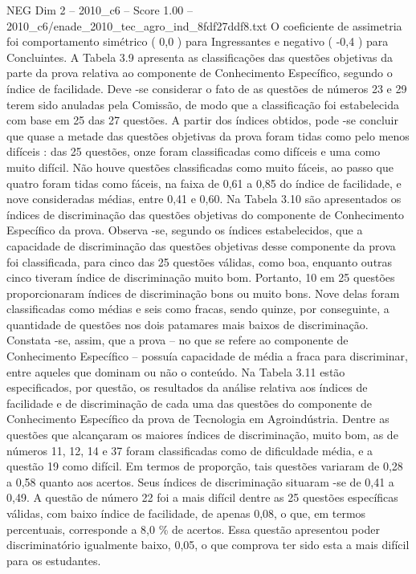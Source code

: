 \begin{textsample}{NEG Dim 2 – 2010\_c6 – Score 1.00 – 2010\_c6/enade\_2010\_tec\_agro\_ind\_8fdf27ddf8.txt}
O coeficiente de assimetria foi comportamento simétrico ( 0,0 ) para Ingressantes e negativo ( -0,4 ) para Concluintes.
A Tabela 3.9 apresenta as classificações das questões objetivas da parte da prova relativa ao componente de Conhecimento Específico, segundo o índice de facilidade.
Deve -se considerar o fato de as questões de números 23 e 29 terem sido anuladas pela Comissão, de modo que a classificação foi estabelecida com base em 25 das 27 questões.
A partir dos índices obtidos, pode -se concluir que quase a metade das questões objetivas da prova foram tidas como pelo menos difíceis : das 25 questões, onze foram classificadas como difíceis e uma como muito difícil.
Não houve questões classificadas como muito fáceis, ao passo que quatro foram tidas como fáceis, na faixa de 0,61 a 0,85 do índice de facilidade, e nove consideradas médias, entre 0,41 e 0,60.
Na Tabela 3.10 são apresentados os índices de discriminação das questões objetivas do componente de Conhecimento Específico da prova.
Observa -se, segundo os índices estabelecidos, que a capacidade de discriminação das questões objetivas desse componente da prova foi classificada, para cinco das 25 questões válidas, como boa, enquanto outras cinco tiveram índice de discriminação muito bom.
Portanto, 10 em 25 questões proporcionaram índices de discriminação bons ou muito bons.
Nove delas foram classificadas como médias e seis como fracas, sendo quinze, por conseguinte, a quantidade de questões nos dois patamares mais baixos de discriminação.
Constata -se, assim, que a prova – no que se refere ao componente de Conhecimento Específico – possuía capacidade de média a fraca para discriminar, entre aqueles que dominam ou não o conteúdo.
Na Tabela 3.11 estão especificados, por questão, os resultados da análise relativa aos índices de facilidade e de discriminação de cada uma das questões do componente de Conhecimento Específico da prova de Tecnologia em Agroindústria.
Dentre as questões que alcançaram os maiores índices de discriminação, muito bom, as de números 11, 12, 14 e 37 foram classificadas como de dificuldade média, e a questão 19 como difícil.
Em termos de proporção, tais questões variaram de 0,28 a 0,58 quanto aos acertos.
Seus índices de discriminação situaram -se de 0,41 a 0,49.
A questão de número 22 foi a mais difícil dentre as 25 questões específicas válidas, com baixo índice de facilidade, de apenas 0,08, o que, em termos percentuais, corresponde a 8,0 \% de acertos.
Essa questão apresentou poder discriminatório igualmente baixo, 0,05, o que comprova ter sido esta a mais difícil para os estudantes.

\end{textsample}
